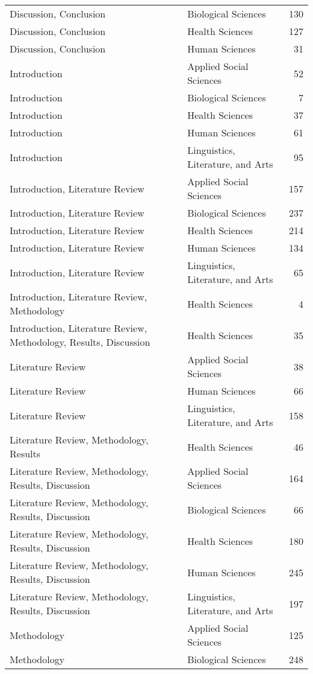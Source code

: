\begin{longtable}{llr}
Discussion, Conclusion & Biological Sciences & 130 \\
Discussion, Conclusion & Health Sciences & 127 \\
Discussion, Conclusion & Human Sciences & 31 \\
Introduction & Applied Social Sciences & 52 \\
Introduction & Biological Sciences & 7 \\
Introduction & Health Sciences & 37 \\
Introduction & Human Sciences & 61 \\
Introduction & Linguistics, Literature, and Arts & 95 \\
Introduction, Literature Review & Applied Social Sciences & 157 \\
Introduction, Literature Review & Biological Sciences & 237 \\
Introduction, Literature Review & Health Sciences & 214 \\
Introduction, Literature Review & Human Sciences & 134 \\
Introduction, Literature Review & Linguistics, Literature, and Arts & 65 \\
Introduction, Literature Review, Methodology & Health Sciences & 4 \\
Introduction, Literature Review, Methodology, Results, Discussion & Health Sciences & 35 \\
Literature Review & Applied Social Sciences & 38 \\
Literature Review & Human Sciences & 66 \\
Literature Review & Linguistics, Literature, and Arts & 158 \\
Literature Review, Methodology, Results & Health Sciences & 46 \\
Literature Review, Methodology, Results, Discussion & Applied Social Sciences & 164 \\
Literature Review, Methodology, Results, Discussion & Biological Sciences & 66 \\
Literature Review, Methodology, Results, Discussion & Health Sciences & 180 \\
Literature Review, Methodology, Results, Discussion & Human Sciences & 245 \\
Literature Review, Methodology, Results, Discussion & Linguistics, Literature, and Arts & 197 \\
Methodology & Applied Social Sciences & 125 \\
Methodology & Biological Sciences & 248 \\

\end{longtable}
